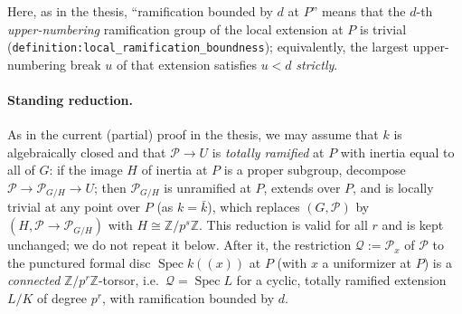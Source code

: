 \documentclass[11pt]{article}
\newcommand{\cP}{\mathcal{P}}
\newcommand{\cQ}{\mathcal{Q}}
\newcommand{\Z}{\mathbb{Z}}
\DeclareMathOperator{\Spec}{Spec}
\theoremstyle{plain}
\theoremstyle{definition}
\begin{document}
Here, as in the thesis, ``ramification bounded by $d$ at $P$'' means that the $d$-th
\emph{upper-numbering} ramification group of the local extension at $P$ is trivial
(\texttt{definition:local\_ramification\_boundness}); equivalently, the largest
upper-numbering break $u$ of that extension satisfies $u<d$ \emph{strictly}.

\paragraph{Standing reduction.}
As in the current (partial) proof in the thesis, we may assume that $k$ is algebraically
closed and that $\cP\to U$ is \emph{totally ramified} at $P$ with inertia equal to all of
$G$: if the image $H$ of inertia at $P$ is a proper subgroup, decompose
$\cP\to\cP_{G/H}\to U$; then $\cP_{G/H}$ is unramified at $P$, extends over $P$, and is
locally trivial at any point over $P$ (as $k=\bar k$), which replaces $(G,\cP)$ by
$(H,\cP\to\cP_{G/H})$ with $H\cong\Z/p^s\Z$. This reduction is valid for all $r$ and is
kept unchanged; we do not repeat it below. After it, the restriction
$\cQ:=\cP_x$ of $\cP$ to the punctured formal disc $\Spec k((x))$ at $P$ (with $x$ a
uniformizer at $P$) is a \emph{connected} $\Z/p^r\Z$-torsor, i.e.\ $\cQ=\Spec L$ for a
cyclic, totally ramified extension $L/K$ of degree $p^r$, with ramification bounded by
$d$.
\end{document}
